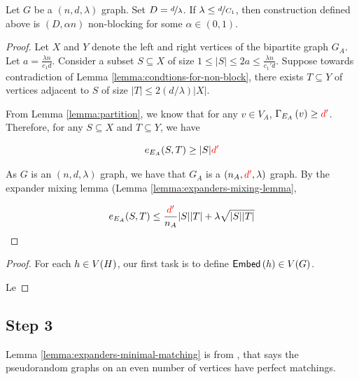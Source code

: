 \documentclass[11pt]{article}
\newcommand{\EnDeeLambda}{(n, d, \lambda)}
\newcommand{\EdgesAccross}[2]{e_{#2}(#1)}
\newcommand{\dApproxLower}{\textcolor{red}{d'}}
\begin{document}
\begin{lemma}\label{lemma:bipartitie-is-non-blocking}Let $G$ be a $\EnDeeLambda$ graph. Set $D = \nicefrac{d}{\lambda}$. If $\lambda \leq \nicefrac{d}{C_1}$, then construction defined above is $(D, \alpha n)$ non-blocking for some $\alpha \in (0,1)$.
\end{lemma}
\begin{proof}
Let $X$ and $Y$ denote the left and right vertices of the bipartite graph $G_A$.
Let $a = \frac{\lambda n}{c_1d}$. Consider a subset $S \subseteq X$ of size $1 \leq |S| \leq 2a \leq \frac{\lambda n}{c_1'd}$. 
Suppose towards contradiction of Lemma \ref{lemma:condtions-for-non-block}, there exists $T \subseteq Y$ of vertices adjacent to $S$ of size $|T| \leq 2(d/\lambda)|X|$.

From Lemma \ref{lemma:partition}, we know that for any $v \in V_A$, $\Neighbourhood{E_A}{v} \geq \dApproxLower$.	
Therefore, for any $S\subseteq X$ and $T \subseteq Y$, we have 

\begin{equation}
\EdgesAccross{S, T}{E_A}	\geq |S| \dApproxLower
\end{equation}

As $G$ is an $\EnDeeLambda$ graph, we have that $G_A$ is a $(n_A, \dApproxLower, \lambda)$ graph.
By the expander mixing lemma (Lemma \ref{lemma:expanders-mixing-lemma}, 

\[ \EdgesAccross{S, T}{E_A}	\leq \frac{\dApproxLower}{n_A}|S||T| + \lambda\sqrt{|S||T|}\]

\end{proof}

\begin{lemma}\label{lemma:top-embedding}	
\end{lemma}

\begin{proof}
For each $h \in V(H)$, our first task is to define $\mathsf{Embed}\left(h\right) \in V(G)$.

Le
	
\end{proof}

\subsection{Step 3}

Lemma \ref{lemma:expanders-minimal-matching} is from \citep[Theorem 4.3]{krivelevich2006pseudo}, that says the pseudorandom graphs on an even number of vertices have perfect matchings.
\end{document}
